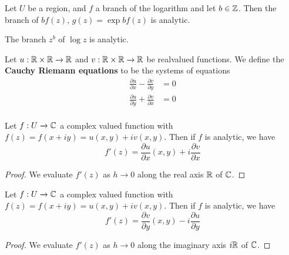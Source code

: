 \begin{lemma}\label{3.2.8}
    Let $U$ be a region, and  $f$ a branch of the logarithm and let  $b \in \mathbb{Z}$.
    Then the branch of  $bf(z)$, $g(z)=\exp{bf(z)}$ is analytic.
\end{lemma}
\begin{corollary}
    The branch $z^b$ of  $\log{z}$ is analytic.
\end{corollary}

\begin{definition}
    Let $u:\mathbb{R} \times \mathbb{R} \xrightarrow{} \mathbb{R}$ and $v:\mathbb{R} \times \mathbb{R} \xrightarrow{}
    \mathbb{R}$ be realvalued functions. We define the \textbf{Cauchy Riemann equations}
    to be the systems of equations
    \begin{align*}
        \frac{\partial{u}}{\partial{x}}-\frac{\partial{v}}{\partial{y}} &= 0 \\
        \frac{\partial{u}}{\partial{y}}+\frac{\partial{v}}{\partial{x}} &= 0 \\
    \end{align*}
\end{definition}

\begin{lemma}\label{3.2.9}
    Let $f:U \xrightarrow{} \mathbb{C}$ a complex valued function with
    $f(z)=f(x+iy)=u(x,y)+iv(x,y)$. Then if $f$ is analytic, we have
    \begin{equation*}
        f'(z)=\frac{\partial{u}}{\partial{x}}(x,y)+i\frac{\partial{v}}{\partial{x}}
    \end{equation*}
\end{lemma}
\begin{proof}
    We evaluate $f'(z)$ as $h \xrightarrow{} 0$ along the real axis $\mathbb{R}$ of
    $\mathbb{C}$.
\end{proof}

\begin{lemma}\label{3.2.10}
    Let $f:U \xrightarrow{} \mathbb{C}$ a complex valued function with
    $f(z)=f(x+iy)=u(x,y)+iv(x,y)$. Then if $f$ is analytic, we have
    \begin{equation*}
        f'(z)=\frac{\partial{v}}{\partial{y}}(x,y)-i\frac{\partial{u}}{\partial{y}}
    \end{equation*}
\end{lemma}
\begin{proof}
    We evaluate $f'(z)$ as $h \xrightarrow{} 0$ along the imaginary axis $i\mathbb{R}$
    of $\mathbb{C}$.
\end{proof}

